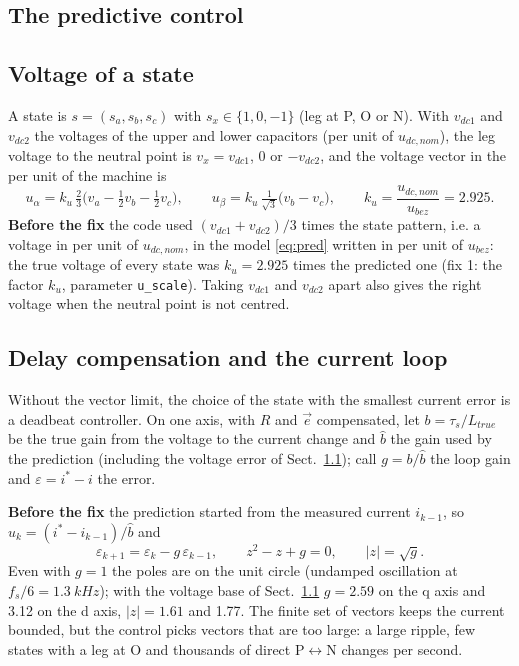 \documentclass[10pt,a4paper]{scrartcl}
\newcommand{\tspu}{\tau_s}
\newcommand{\code}[1]{\texttt{#1}}
\newcommand{\ub}{u_{bez}}
\newcommand{\udcn}{u_{dc,nom}}
\begin{document}
\begin{onehalfspace}
\section{The predictive control}
\label{sec:mpc}

\subsection{Voltage of a state}
\label{sec:voltage}

A state is $s = (s_a, s_b, s_c)$ with $s_x \in \{1, 0, -1\}$ (leg at P, O or N). With $v_{dc1}$ and $v_{dc2}$ the voltages of the upper and lower capacitors (per unit of $\udcn$), the leg voltage to the neutral point is $v_x = v_{dc1}$, $0$ or $-v_{dc2}$, and the voltage vector in the per unit of the machine is
\begin{equation}
u_\alpha = k_u\,\tfrac23\big(v_a - \tfrac12 v_b - \tfrac12 v_c\big), \qquad
u_\beta = k_u\,\tfrac{1}{\sqrt3}\big(v_b - v_c\big), \qquad k_u = \frac{\udcn}{\ub} = 2.925 .
\label{eq:ustate}
\end{equation}
\textbf{Before the fix} the code used $(v_{dc1} + v_{dc2})/3$ times the state pattern, i.e. a voltage in per unit of $\udcn$, in the model \eqref{eq:pred} written in per unit of $\ub$: the true voltage of every state was $k_u = 2.925$ times the predicted one (fix 1: the factor $k_u$, parameter \code{u\_scale}). Taking $v_{dc1}$ and $v_{dc2}$ apart also gives the right voltage when the neutral point is not centred.

\subsection{Delay compensation and the current loop}
\label{sec:deadbeat}

Without the vector limit, the choice of the state with the smallest current error is a deadbeat controller. On one axis, with $R$ and $\vec e$ compensated, let $b = \tspu/L_{true}$ be the true gain from the voltage to the current change and $\hat b$ the gain used by the prediction (including the voltage error of Sect.~\ref{sec:voltage}); call $g = b/\hat b$ the loop gain and $\varepsilon = i^* - i$ the error.

\textbf{Before the fix} the prediction started from the measured current $i_{k-1}$, so $u_k = (i^* - i_{k-1})/\hat b$ and
\begin{equation}
\varepsilon_{k+1} = \varepsilon_k - g\,\varepsilon_{k-1}, \qquad z^2 - z + g = 0, \qquad |z| = \sqrt g .
\label{eq:nocomp}
\end{equation}
Even with $g = 1$ the poles are on the unit circle (undamped oscillation at $f_s/6 = \SI{1.3}{kHz}$); with the voltage base of Sect.~\ref{sec:voltage} $g = 2.59$ on the q axis and 3.12 on the d axis, $|z| = 1.61$ and 1.77. The finite set of vectors keeps the current bounded, but the control picks vectors that are too large: a large ripple, few states with a leg at O and thousands of direct P$\leftrightarrow$N changes per second.


\end{onehalfspace}
\end{document}
